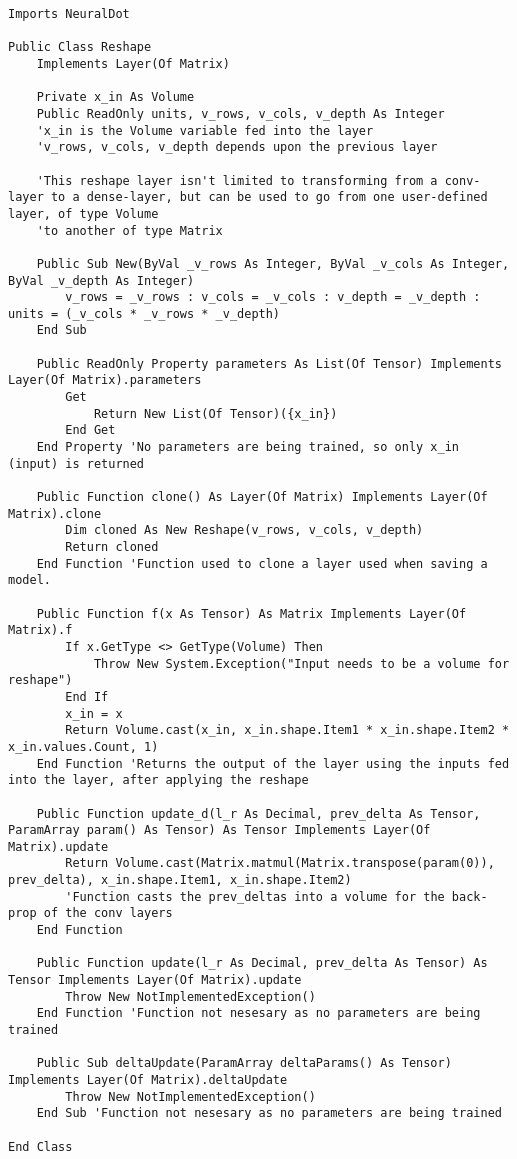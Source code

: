 \begin{verbatim}
Imports NeuralDot

Public Class Reshape
    Implements Layer(Of Matrix)

    Private x_in As Volume
    Public ReadOnly units, v_rows, v_cols, v_depth As Integer
    'x_in is the Volume variable fed into the layer
    'v_rows, v_cols, v_depth depends upon the previous layer

    'This reshape layer isn't limited to transforming from a conv-layer to a dense-layer, but can be used to go from one user-defined layer, of type Volume
    'to another of type Matrix

    Public Sub New(ByVal _v_rows As Integer, ByVal _v_cols As Integer, ByVal _v_depth As Integer)
        v_rows = _v_rows : v_cols = _v_cols : v_depth = _v_depth : units = (_v_cols * _v_rows * _v_depth)
    End Sub

    Public ReadOnly Property parameters As List(Of Tensor) Implements Layer(Of Matrix).parameters
        Get
            Return New List(Of Tensor)({x_in})
        End Get
    End Property 'No parameters are being trained, so only x_in (input) is returned 

    Public Function clone() As Layer(Of Matrix) Implements Layer(Of Matrix).clone
        Dim cloned As New Reshape(v_rows, v_cols, v_depth)
        Return cloned
    End Function 'Function used to clone a layer used when saving a model.

    Public Function f(x As Tensor) As Matrix Implements Layer(Of Matrix).f
        If x.GetType <> GetType(Volume) Then
            Throw New System.Exception("Input needs to be a volume for reshape")
        End If
        x_in = x
        Return Volume.cast(x_in, x_in.shape.Item1 * x_in.shape.Item2 * x_in.values.Count, 1)
    End Function 'Returns the output of the layer using the inputs fed into the layer, after applying the reshape

    Public Function update_d(l_r As Decimal, prev_delta As Tensor, ParamArray param() As Tensor) As Tensor Implements Layer(Of Matrix).update
        Return Volume.cast(Matrix.matmul(Matrix.transpose(param(0)), prev_delta), x_in.shape.Item1, x_in.shape.Item2)
        'Function casts the prev_deltas into a volume for the back-prop of the conv layers
    End Function

    Public Function update(l_r As Decimal, prev_delta As Tensor) As Tensor Implements Layer(Of Matrix).update
        Throw New NotImplementedException()
    End Function 'Function not nesesary as no parameters are being trained

    Public Sub deltaUpdate(ParamArray deltaParams() As Tensor) Implements Layer(Of Matrix).deltaUpdate
        Throw New NotImplementedException()
    End Sub 'Function not nesesary as no parameters are being trained

End Class
\end{verbatim}